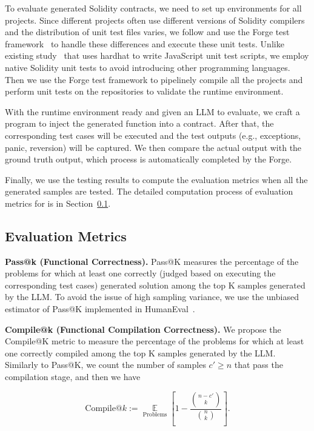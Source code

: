 To evaluate generated Solidity contracts, we need to set up environments for all projects. 
Since different projects often use different versions of Solidity compilers and the distribution of unit test files varies, we follow \citet{britikov2024soltg} and use the Forge test framework~\cite{Foundry} to handle these differences and execute these unit tests. 
Unlike existing study~\cite{benchmark2024sol} that uses hardhat to write JavaScript unit test scripts, we employ native Solidity unit tests to avoid introducing other programming languages. 
Then we use the Forge test framework to pipelinely compile all the projects and perform unit tests on the repositories to validate the runtime environment.


With the runtime environment ready and given an LLM to evaluate, we craft a program to inject the generated function into a contract. 
After that, the corresponding test cases will be executed and the test outputs (e.g., exceptions, panic, reversion) will be captured.
We then compare the actual output with the ground truth output, which process is automatically completed by the Forge. 


Finally, we use the testing results to compute the evaluation metrics when all the generated samples are tested. 
The detailed computation process of evaluation metrics for \mytitle is in Section~\ref{sec:eval_metrics}.


\subsection{Evaluation Metrics}
\label{sec:eval_metrics}
\textbf{Pass@k (Functional Correctness).}
Pass@K measures the percentage of the problems for which at least one correctly (judged based on executing the corresponding test cases) generated solution among the top K samples generated by the LLM. 
To avoid the issue of high sampling variance, we use the unbiased estimator of Pass@K implemented in HumanEval~\cite{chen2021evaluating}.


\noindent
\textbf{Compile@k (Functional Compilation Correctness).}
We propose the Compile@K metric to measure the percentage of the problems for which at least one correctly compiled among the top K samples generated by the LLM. 
Similarly to Pass@K, we count the number of samples \( c' \geq n \) that pass the compilation stage, and then we have


\vspace{-0.5cm}
\begin{equation}
\text{Compile@}k := \mathop{\mathbb{E}}\limits_{\text{Problems}} \left[ 1 - \frac{\binom{n-c'}{k}}{\binom{n}{k}} \right].
\end{equation}


